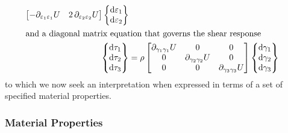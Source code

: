 \begin{subequations}
\begin{align}
\begin{bmatrix}
    - \partial_{\varepsilon_1 \varepsilon_1} U & 2 \, \partial_{\varepsilon_2 \varepsilon_2} U 
    \end{bmatrix}
    \left\{ \begin{matrix}
    \mathrm{d} \varepsilon_1 \\ \mathrm{d} \varepsilon_2 
    \end{matrix} \right\} \\
    \intertext{and a diagonal matrix equation that governs the shear response}
    \left\{ \begin{matrix} 
    \mathrm{d} \tau_1 \\ \mathrm{d} \tau_2 \\ \mathrm{d} \tau_3
    \end{matrix} \right\} & = \rho \begin{bmatrix}
    \partial_{\gamma_1\gamma_1} U & 0 & 0 \\
    0 & \partial_{\gamma_2\gamma_2} U & 0 \\
    0 & 0 & \partial_{\gamma_3\gamma_3} U
    \end{bmatrix}
    \left\{ \begin{matrix}
    \mathrm{d} \gamma_1 \\ \mathrm{d} \gamma_2 \\ \mathrm{d} \gamma_3
    \end{matrix} \right\}
    \end{align}
\end{subequations}
to which we now seek an interpretation when expressed in terms of a set of specified material properties.

\subsubsection{Material Properties}
\label{secMaterialConstants3D}

